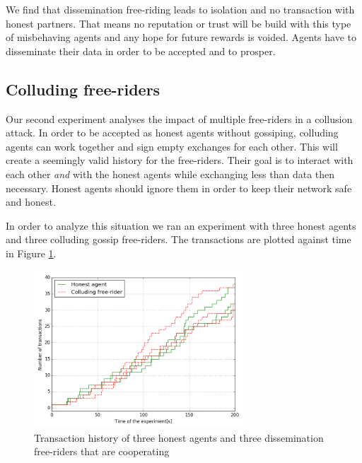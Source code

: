 We find that dissemination free-riding leads to isolation and no transaction with honest partners. 
That means no reputation or trust will be build with this type of misbehaving agents and any hope for
future rewards is voided. Agents have to disseminate their data in order to be accepted and to prosper.

\subsection{Colluding free-riders}
Our second experiment analyses the impact of multiple free-riders in a collusion attack. In order to
be accepted as honest agents without gossiping, colluding agents can work together and sign empty exchanges for 
each other. This will create a seemingly valid history for the free-riders. Their goal is to interact 
with each other \textit{and} with the honest agents while exchanging less than data then necessary. Honest agents
should ignore them in order to keep their network safe and honest.

In order to analyze this situation we ran an experiment with three honest agents and three colluding gossip 
free-riders. The transactions are plotted against time in Figure \ref{fig:50percent}.

\begin{figure}[h!]
    \centering
    \includegraphics[width=0.7\textwidth]{images/50percent}
    \caption{Transaction history of three honest agents and three dissemination free-riders
    that are cooperating}
    \label{fig:50percent}
\end{figure}

